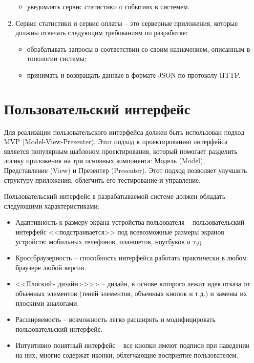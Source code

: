 \begin{enumerate}
\begin{itemize}
        \item уведомлять сервис статистики о событиях в системем.
    \end{itemize}
    \item Сервис статистики и сервис оплаты -- это серверные приложения, которые должны отвечать следующим требованиям по разработке:
    \begin{itemize}
        \item обрабатывать запросы в соответствии со своим назначением, описанным в топологии системы;
        \item принимать и возвращать данные в формате JSON по протоколу HTTP.
    \end{itemize}
\end{enumerate}



\section{Пользовательский интерфейс}

Для реализации пользовательского интерфейса должен быть использован подход MVP (Model-View-Presenter). Этот подход к проектированию интерфейса является популярным шаблоном проектирования, который помогает разделить логику приложения на три основных компонента: Модель (Model), Представление (View) и Презентер (Presenter). Этот подход позволяет улучшить структуру приложения, облегчить его тестирование и управление.

Пользовательский интерфейс в разрабатываемой системе должен обладать следующими характеристиками:
\begin{itemize}
    \item Адаптивность к размеру экрана устройства пользователя -- пользовательский интерфейс <<подстраивается>> под всевозможные размеры экранов устройств: мобильных телефонов, планшетов, ноутбуков и т.д.
    \item Кроссбраузерность -- способность интерфейса работать практически в любом браузере любой версии. 
    \item <<Плоский» дизайн>>>> -- дизайн, в основе которого лежит идея отказа от объемных элементов (теней элементов, объемных кнопок и т.д.) и замены их плоскими аналогами.
    \item Расширяемость -- возможность легко расширять и модифицировать пользовательский интерфейс.
    \item Интуитивно понятный интерфейс -- все кнопки имеют подписи при наведении на них, многие содержат иконки, облегчающие восприятие пользователем.
\end{itemize}